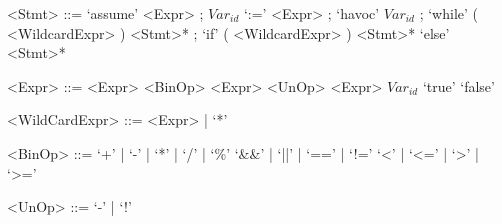 
\begin{grammar}
	<Stmt> ::= `assume' <Expr> ;
	\alt $Var_{id}$ `:=' <Expr> ;
	\alt `havoc' $Var_{id}$ ;
	\alt `while' ( <WildcardExpr> ) <Stmt>* ;
	\alt `if' ( <WildcardExpr> ) <Stmt>* `else' <Stmt>*
	
	<Expr> ::= <Expr> <BinOp> <Expr>
	\alt <UnOp> <Expr>
	\alt $Var_{id}$
	\alt `true'
	\alt `false'
	
	<WildCardExpr> ::= <Expr> | `*'
	
	<BinOp> ::= `+' | `-' | `*' | `/' | `\%'
	\alt `\&\&' | `||' | `==' | `!='
	\alt `<' | `<=' | `>' | `>='
	
	<UnOp> ::= `-' | `!'
\end{grammar}